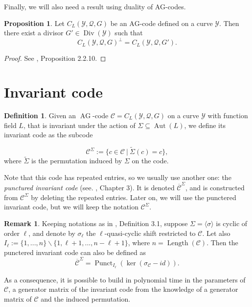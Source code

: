 \documentclass[10pt]{article}
\theoremstyle{definition}
\newtheorem{def1}[thm]{Definition}
\newtheorem{prop1}[thm]{Proposition}
\theoremstyle{definition}
\newtheorem{rq1}[thm]{Remark}
\theoremstyle{definition}
\newcommand{\s}{\vspace{0.3cm}}
\newcommand{\C}{\mathcal{C}}
\newcommand{\su}{\subseteq}
\newcommand{\Y}{\mathcal{Y}}
\newcommand{\QR}{\mathcal{Q}}
\newcommand{\Div}{\operatorname{Div}}
\newcommand{\Aut}{\operatorname{Aut}}
\newcommand{\ag}{\operatorname{AG}}
\begin{document}
\s

Finally, we will also need a result using duality of AG-codes.

\s

\begin{prop1} \label{dual}
Let $C_L(\Y,\QR,G)$ be an $\mathrm{AG}$-code defined on a curve $\Y$. Then there exist a divisor $G' \in \Div(\Y)$ such that 
\[C_L(\Y,\QR,G)^{\perp} = C_L(\Y,\QR,G').\]
\end{prop1}

\s

\begin{proof}
See \cite{Sti}, Proposition 2.2.10.
\end{proof}

\section{Invariant code}

\s

\begin{def1} Given an $\ag$-code $\mathcal{C} = C_L(\Y,\QR,G)$ on a curve $\Y$ with function field $L$, that is invariant under the action of $\Sigma \su \Aut(L)$, we define its invariant code as the subcode 

\[\mathcal{C}^{\Sigma} := \{c \in \mathcal{C} \ | \ \tilde{\Sigma}(c)=c\},\]
where $\tilde{\Sigma}$ is the permutation induced by $\Sigma$ on the code.
\end{def1}
\s

Note that this code has repeated entries, so we usually use another one: the \emph{punctured invariant code} (see. \cite{Bar}, Chapter 3). It is denoted $\overline{\mathcal{C}}^{\Sigma}$, and is constructed from $\C^{\Sigma}$ by deleting the repeated entries. Later on, we will use the punctered invariant code, but we will keep the notation $\mathcal{C}^{\Sigma}$. 

\s

\begin{rq1}  \label{gen inv}
Keeping notations as in \cite{Bar}, Definition 3.1, suppose $\Sigma = \langle \sigma \rangle$ is cyclic of order $\ell$, and denote by $\sigma_{\ell}$ the $\ell$-quasi-cyclic shift restricted to $\mathcal{C}$. Let also $I_{\ell} := \{1,...,n\}\backslash \{1,\ell+1,...,n-\ell+1\}$, where $n=\operatorname{Length}(\mathcal{C})$. Then the punctered invariant code can also be defined as
\[ \overline{\mathcal{C}}^{\Sigma} = \operatorname{Punct}_{ I_{\ell}}(\ker (\sigma_{\mathcal{C}}-id)).\]

\s

As a consequence, it is possible to build in polynomial time in the parameters of $\mathcal{C}$, a generator matrix of the invariant code from the knowledge of a generator matrix of $\mathcal{C}$ and the induced permutation. 
\end{rq1}
\end{document}
